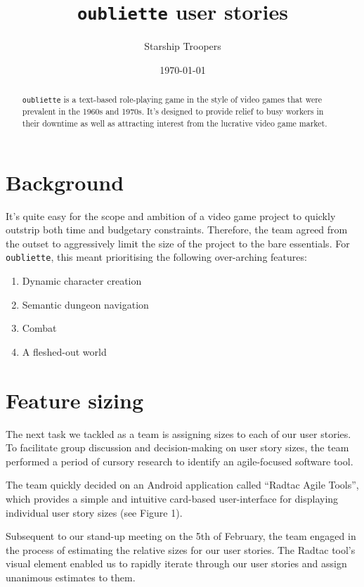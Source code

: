 \documentclass[a4paper,12pt]{article}
\title{\texttt{oubliette} user stories}
\author{Starship Troopers}
\date{\today}
\begin{document}
\maketitle

\begin{abstract}
\texttt{oubliette} is a text-based role-playing game in the style of
video games that were prevalent in the 1960s and 1970s. It's designed
to provide relief to busy workers in their downtime as well as attracting
interest from the lucrative video game market.
\end{abstract}

\section{Background}
It's quite easy for the scope and ambition of a video game project to
quickly outstrip both time and budgetary constraints. Therefore, the team
agreed from the outset to aggressively limit the size of the project to
the bare essentials. For \texttt{oubliette}, this meant prioritising the
following over-arching features:

\begin{enumerate}
\item Dynamic character creation
\item Semantic dungeon navigation
\item Combat
\item A fleshed-out world
\end{enumerate}

\section{Feature sizing}
The next task we tackled as a team is assigning sizes to each of our
user stories. To facilitate group discussion and decision-making on user
story sizes, the team performed a period of cursory research to identify
an agile-focused software tool.

The team quickly decided on an Android application called
``Radtac Agile Tools'', which provides a simple and intuitive card-based
user-interface for displaying individual user story sizes (see Figure 1).

Subsequent to our stand-up meeting on the 5th of February, the team
engaged in the process of estimating the relative sizes for our user
stories. The Radtac tool's visual element enabled us to rapidly iterate
through our user stories and assign unanimous estimates to them.
\end{document}
